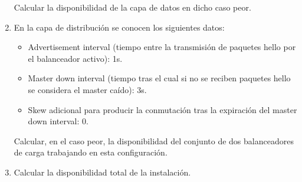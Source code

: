 \begin{problem}[11]
\begin{enumerate}
\begin{itemize}
\end{itemize}

Calcular la disponibilidad de la capa de datos en dicho caso peor.
	\item En la capa de distribución se conocen los siguientes datos:
\begin{itemize}
	\item Advertisement interval (tiempo entre la transmisión de paquetes hello por el balanceador activo): 1s.
	\item Master down interval (tiempo tras el cual si no se reciben paquetes hello se considera el master caído): 3s.
	\item Skew adicional para producir la conmutación tras la expiración del master down interval: 0.

\end{itemize}

Calcular, en el caso peor, la disponibilidad del conjunto de dos balanceadores de carga trabajando en esta configuración.
	\item Calcular la disponibilidad total de la instalación.
\end{enumerate}

\solution


\end{problem}